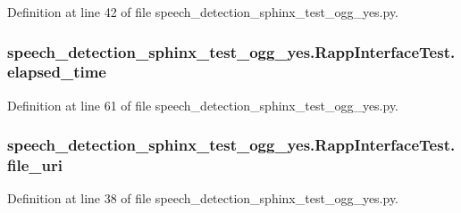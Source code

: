 Definition at line 42 of file speech\-\_\-detection\-\_\-sphinx\-\_\-test\-\_\-ogg\-\_\-yes.\-py.

\hypertarget{classspeech__detection__sphinx__test__ogg__yes_1_1RappInterfaceTest_abe6d54c2afc9977193696591f44cbe35}{
\subsubsection[{elapsed\-\_\-time}]{\setlength{\rightskip}{0pt plus 5cm}speech\-\_\-detection\-\_\-sphinx\-\_\-test\-\_\-ogg\-\_\-yes.\-Rapp\-Interface\-Test.\-elapsed\-\_\-time}}\label{classspeech__detection__sphinx__test__ogg__yes_1_1RappInterfaceTest_abe6d54c2afc9977193696591f44cbe35}


Definition at line 61 of file speech\-\_\-detection\-\_\-sphinx\-\_\-test\-\_\-ogg\-\_\-yes.\-py.

\hypertarget{classspeech__detection__sphinx__test__ogg__yes_1_1RappInterfaceTest_a894edfd6bba80364efb2c1e1f068d449}{
\subsubsection[{file\-\_\-uri}]{\setlength{\rightskip}{0pt plus 5cm}speech\-\_\-detection\-\_\-sphinx\-\_\-test\-\_\-ogg\-\_\-yes.\-Rapp\-Interface\-Test.\-file\-\_\-uri}}\label{classspeech__detection__sphinx__test__ogg__yes_1_1RappInterfaceTest_a894edfd6bba80364efb2c1e1f068d449}


Definition at line 38 of file speech\-\_\-detection\-\_\-sphinx\-\_\-test\-\_\-ogg\-\_\-yes.\-py.

